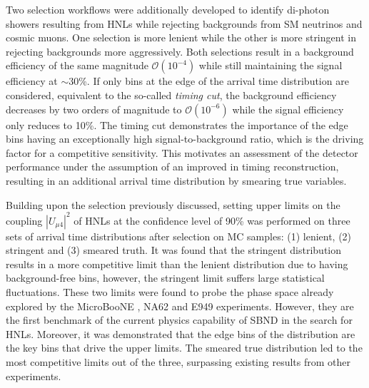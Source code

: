 Two selection workflows were additionally developed to identify di-photon showers resulting from HNLs while rejecting backgrounds from SM neutrinos and cosmic muons.
One selection is more lenient while the other is more stringent in rejecting backgrounds more aggressively.
Both selections result in a background efficiency of the same magnitude $\mathcal{O}(10^{-4})$ while still maintaining the signal efficiency at $\sim$30\%.
If only bins at the edge of the arrival time distribution are considered, equivalent to the so-called \textit{timing cut}, the background efficiency decreases by two orders of magnitude to $\mathcal{O}(10^{-6})$ while the signal efficiency only reduces to 10\%. 
The timing cut demonstrates the importance of the edge bins having an exceptionally high signal-to-background ratio, which is the driving factor for a competitive sensitivity.
This motivates an assessment of the detector performance under the assumption of an improved in timing reconstruction, resulting in an additional arrival time distribution by smearing true variables.

Building upon the selection previously discussed, setting upper limits on the coupling $|U_{\mu4}|^2$ of HNLs at the confidence level of 90\% was performed on three sets of arrival time distributions after selection on MC samples: (1) lenient, (2) stringent and (3) smeared truth.  
It was found that the stringent distribution results in a more competitive limit than the lenient distribution due to having background-free bins, however, the stringent limit suffers large statistical fluctuations.
These two limits were found to probe the phase space already explored by the MicroBooNE \cite{uboone1, uboone2, uboone3}, NA62 \cite{NA62A, NA62B} and E949 \cite{E949} experiments.
However, they are the first benchmark of the current physics capability of SBND in the search for HNLs.
Moreover, it was demonstrated that the edge bins of the distribution are the key bins that drive the upper limits.   
The smeared true distribution led to the most competitive limits out of the three, surpassing existing results from other experiments.  

